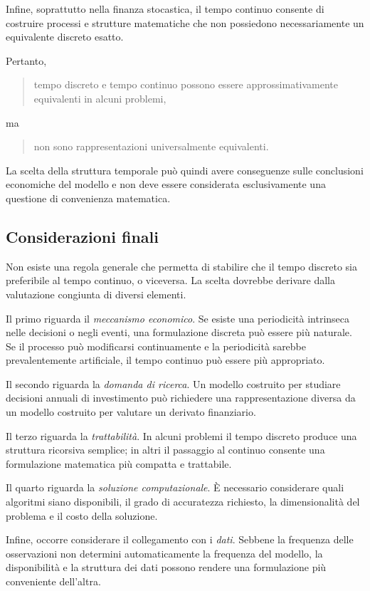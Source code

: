 \documentclass{book}
\begin{document}
Infine, soprattutto nella finanza stocastica, il tempo continuo consente di costruire processi e strutture matematiche che non possiedono necessariamente un equivalente discreto esatto.

Pertanto,

\begin{quotation}
tempo discreto e tempo continuo possono essere approssimativamente equivalenti in alcuni problemi,
\end{quotation}
ma
\begin{quotation}
non sono rappresentazioni universalmente equivalenti.
\end{quotation}


La scelta della struttura temporale può quindi avere conseguenze sulle conclusioni economiche del modello e non deve essere considerata esclusivamente una questione di convenienza matematica.

\subsection{Considerazioni finali}

Non esiste una regola generale che permetta di stabilire che il tempo discreto sia preferibile al tempo continuo, o viceversa. La scelta dovrebbe derivare dalla valutazione congiunta di diversi elementi.

Il primo riguarda il \emph{meccanismo economico}. Se esiste una periodicità intrinseca nelle decisioni o negli eventi, una formulazione discreta può essere più naturale. Se il processo può modificarsi continuamente e la periodicità sarebbe prevalentemente artificiale, il tempo continuo può essere più appropriato.

Il secondo riguarda la \emph{domanda di ricerca}. Un modello costruito per studiare decisioni annuali di investimento può richiedere una rappresentazione diversa da un modello costruito per valutare un derivato finanziario.

Il terzo riguarda la \emph{trattabilità}. In alcuni problemi il tempo discreto produce una struttura ricorsiva semplice; in altri il passaggio al continuo consente una formulazione matematica più compatta e trattabile.

Il quarto riguarda la \emph{soluzione computazionale}. È necessario considerare quali algoritmi siano disponibili, il grado di accuratezza richiesto, la dimensionalità del problema e il costo della soluzione.

Infine, occorre considerare il collegamento con i \emph{dati}. Sebbene la frequenza delle osservazioni non determini automaticamente la frequenza del modello, la disponibilità e la struttura dei dati possono rendere una formulazione più conveniente dell'altra.
\end{document}
